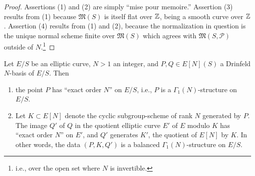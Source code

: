 \begin{proof}
Assertions (1) and (2) are simply ``mise pour memoire.'' Assertion (3) results from (1) because $\mathfrak{M}(S)$ is itself flat over $\mathbb{Z}$, being a smooth curve over $\mathbb{Z}$. Assertion (4) results from (1) and (2), because the normalization in question is the unique normal scheme finite over $\mathfrak{M}(S)$ which agrees with $\mathfrak{M}(S, \mathcal{P})$ outside of $N$.\footnote{i.e., over the open set where $N$ is invertible.}
\end{proof}

\begin{kthm}\label{thm:5.5.2}
Let $E/S$ be an elliptic curve, $N > 1$ an integer, and $P, Q \in E[N](S)$ a Drinfeld $N$-basis of $E/S$. Then
\begin{enumerate}[(1)]
\item the point $P$ has ``exact order $N$'' on $E/S$, i.e., $P$ is a $\Gamma_1(N)$-structure on $E/S$.
\item Let $K \subset E[N]$ denote the cyclic subgroup-scheme of rank $N$ generated by $P$. The image $Q'$ of $Q$ in the quotient elliptic curve $E'$ of $E$ modulo $K$ has ``exact order $N$'' on $E'$, and $Q'$ generates $K'$, the quotient of $E[N]$ by $K$. In other words, the data $(P, K, Q')$ is a balanced $\Gamma_1(N)$-structure on $E/S$.
\end{enumerate}
\end{kthm}


